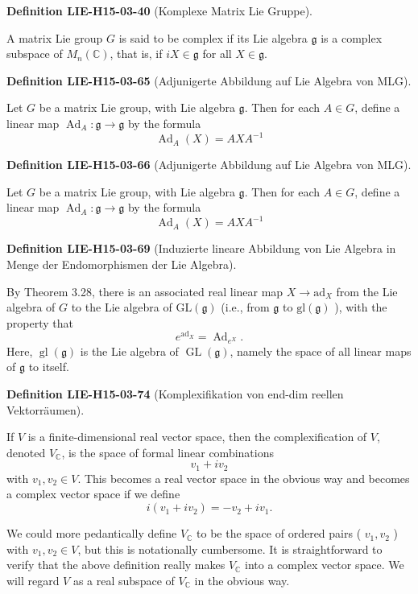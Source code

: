 \documentclass[10pt, letterpaper]{article}
\newcommand{\CustomHeading}[3]{%
  \par\medskip\noindent%
  \textbf{#1 #2} \textnormal{(#3)}.\enskip%
}
\newenvironment{DEF}[2]{\CustomHeading{Definition}{#1}{#2}}{}
\begin{document}
\begin{DEF}{LIE-H15-03-40}{Komplexe Matrix Lie Gruppe}
A matrix Lie group $G$ is said to be complex if its Lie algebra $\mathfrak{g}$ is a complex subspace of $M_{n}(\mathbb{C})$, that is, if $i X \in \mathfrak{g}$ for all $X \in \mathfrak{g}$.
\end{DEF}

\begin{DEF}{LIE-H15-03-65}{Adjunigerte Abbildung auf Lie Algebra von MLG}
Let $G$ be a matrix Lie group, with Lie algebra $\mathfrak{g}$. Then for each $A \in G$, define a linear map $\operatorname{Ad}_{A}: \mathfrak{g} \rightarrow \mathfrak{g}$ by the formula
$$
\operatorname{Ad}_{A}(X)=A X A^{-1}
$$
\end{DEF}

\begin{DEF}{LIE-H15-03-66}{Adjunigerte Abbildung auf Lie Algebra von MLG}
Let $G$ be a matrix Lie group, with Lie algebra $\mathfrak{g}$. Then for each $A \in G$, define a linear map $\operatorname{Ad}_{A}: \mathfrak{g} \rightarrow \mathfrak{g}$ by the formula
$$
\operatorname{Ad}_{A}(X)=A X A^{-1}
$$
\end{DEF}

\begin{DEF}{LIE-H15-03-69}{Induzierte lineare Abbildung von Lie Algebra in Menge der Endomorphismen der Lie Algebra}
By Theorem 3.28, there is an associated real linear map $X \rightarrow \mathrm{ad}_{X}$ from the Lie algebra of $G$ to the Lie algebra of $\mathrm{GL}(\mathfrak{g})$ (i.e., from $\mathfrak{g}$ to $\mathrm{gl}(\mathfrak{g})$ ), with the property that
$$
e^{\mathrm{ad}_{X}}=\operatorname{Ad}_{e^{X}} .
$$
Here, $\operatorname{gl}(\mathfrak{g})$ is the Lie algebra of $\operatorname{GL}(\mathfrak{g})$, namely the space of all linear maps of $\mathfrak{g}$ to itself.
\end{DEF}

\begin{DEF}{LIE-H15-03-74}{Komplexifikation von end-dim reellen Vektorräumen}
If $V$ is a finite-dimensional real vector space, then the complexification of $V$, denoted $V_{\mathbb{C}}$, is the space of formal linear combinations
$$
v_{1}+i v_{2}
$$
with $v_{1}, v_{2} \in V$. This becomes a real vector space in the obvious way and becomes a complex vector space if we define
$$
i\left(v_{1}+i v_{2}\right)=-v_{2}+i v_{1} .
$$

We could more pedantically define $V_{\mathbb{C}}$ to be the space of ordered pairs ( $v_{1}, v_{2}$ ) with $v_{1}, v_{2} \in V$, but this is notationally cumbersome. It is straightforward to verify that the above definition really makes $V_{\mathbb{C}}$ into a complex vector space. We will regard $V$ as a real subspace of $V_{\mathbb{C}}$ in the obvious way.
\end{DEF}
\end{document}
